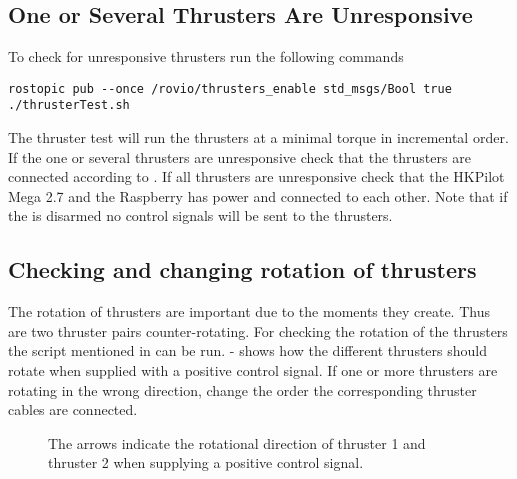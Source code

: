 \subsection{One or Several Thrusters Are Unresponsive}\label{subsec:unresponsive}
To check for unresponsive thrusters run the following commands 
\begin{lstlisting}
rostopic pub --once /rovio/thrusters_enable std_msgs/Bool true
./thrusterTest.sh
\end{lstlisting}
The thruster test will run the thrusters at a minimal torque in incremental order. If the one or several thrusters are unresponsive check that the thrusters are connected according to . If all thrusters are unresponsive check that the HKPilot Mega 2.7 and the Raspberry has power and connected to each other. Note that if the \abbrROV is disarmed no control signals will be sent to the thrusters.

\subsection{Checking and changing rotation of thrusters}
The rotation of thrusters are important due to the moments they create. Thus are two thruster pairs counter-rotating. For checking the rotation of the thrusters the script mentioned in  can be run.  -  shows how the different thrusters should rotate when supplied with a positive control signal. If one or more thrusters are rotating in the wrong direction, change the order the corresponding thruster cables are connected. 

\begin{figure}
\centering
{}
    \caption{The arrows indicate the rotational direction of thruster 1 and thruster 2 when supplying a positive control signal.}
    \label{fig:thrusterRotation12}
\end{figure}

